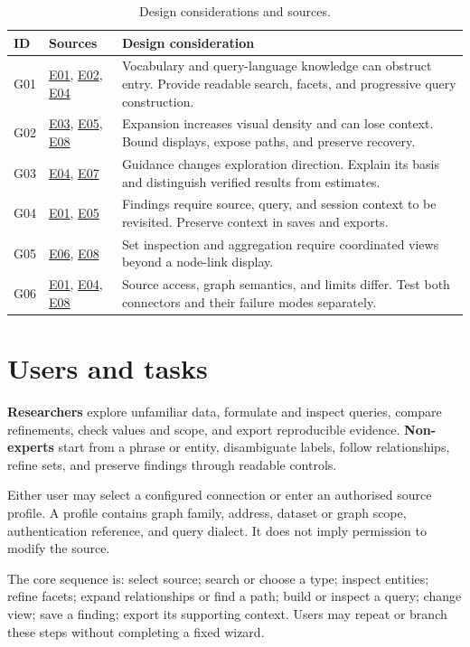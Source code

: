 \documentclass[11pt,a4paper]{article}
\newcommand{\evidence}[1]{\hyperlink{evidence:#1}{#1}}
\begin{document}
\begin{table}[htbp]\centering\small
\caption{Design considerations and sources.}\label{tab:gaps}
\begin{tabularx}{\textwidth}{@{}P{1cm}P{2.1cm}X@{}}
\toprule ID & Sources & Design consideration\\\midrule
G01 & \evidence{E01}, \evidence{E02}, \evidence{E04} & Vocabulary and query-language knowledge can obstruct entry. Provide readable search, facets, and progressive query construction.\\
G02 & \evidence{E03}, \evidence{E05}, \evidence{E08} & Expansion increases visual density and can lose context. Bound displays, expose paths, and preserve recovery.\\
G03 & \evidence{E04}, \evidence{E07} & Guidance changes exploration direction. Explain its basis and distinguish verified results from estimates.\\
G04 & \evidence{E01}, \evidence{E05} & Findings require source, query, and session context to be revisited. Preserve context in saves and exports.\\
G05 & \evidence{E06}, \evidence{E08} & Set inspection and aggregation require coordinated views beyond a node-link display.\\
G06 & \evidence{E01}, \evidence{E04}, \evidence{E08} & Source access, graph semantics, and limits differ. Test both connectors and their failure modes separately.\\
\bottomrule\end{tabularx}\end{table}

\section{Users and tasks}
\textbf{Researchers} explore unfamiliar data, formulate and inspect queries, compare refinements, check values and scope, and export reproducible evidence. \textbf{Non-experts} start from a phrase or entity, disambiguate labels, follow relationships, refine sets, and preserve findings through readable controls.

Either user may select a configured connection or enter an authorised source profile. A profile contains graph family, address, dataset or graph scope, authentication reference, and query dialect. It does not imply permission to modify the source.

The core sequence is: select source; search or choose a type; inspect entities; refine facets; expand relationships or find a path; build or inspect a query; change view; save a finding; export its supporting context. Users may repeat or branch these steps without completing a fixed wizard.
\end{document}
